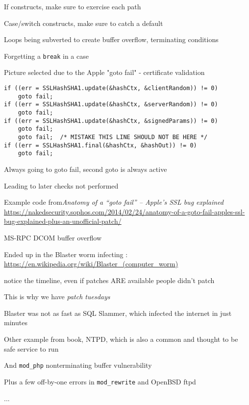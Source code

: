\documentclass[Screen16to9,17pt]{foils}
\begin{document}


\begin{list2}
\item If constructs, make sure to exercise each path
\item Case/switch constructs, make sure to catch a default
\item Loops being subverted to create buffer overflow, terminating conditions
\item Forgetting a \verb+break+ in a case
\item Picture selected due to the Apple "goto fail" - certificate validation\\
\end{list2}



\begin{verbatim}
if ((err = SSLHashSHA1.update(&hashCtx, &clientRandom)) != 0)
    goto fail;
if ((err = SSLHashSHA1.update(&hashCtx, &serverRandom)) != 0)
    goto fail;
if ((err = SSLHashSHA1.update(&hashCtx, &signedParams)) != 0)
    goto fail;
    goto fail;  /* MISTAKE THIS LINE SHOULD NOT BE HERE */
if ((err = SSLHashSHA1.final(&hashCtx, &hashOut)) != 0)
    goto fail;
\end{verbatim}

\begin{list2}
\item Always going to goto fail, second goto is always active
\item Leading to later checks not performed
\item Example code from\emph{Anatomy of a “goto fail” – Apple’s SSL bug explained}\\ {\footnotesize\url{https://nakedsecurity.sophos.com/2014/02/24/anatomy-of-a-goto-fail-apples-ssl-bug-explained-plus-an-unofficial-patch/}}

\end{list2}



\begin{list2}
\item MS-RPC DCOM buffer overflow
\item Ended up in the Blaster worm infecting : \url{https://en.wikipedia.org/wiki/Blaster_(computer_worm)}
\item notice the timeline, even if patches ARE available people didn't patch
\item This is why we have \emph{patch tuesdays}
\item Blaster was not as fast as SQL Slammer, which infected the internet in just minutes
\item Other example from book, NTPD, which is also a common and thought to be safe service to run
\item And \verb+mod_php+ nonterminating buffer vulnerability
\item Plus a few off-by-one errors in \verb+mod_rewrite+ and OpenBSD ftpd
\item ...
\end{list2}
\end{document}
